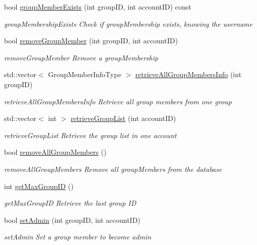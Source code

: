 \begin{DoxyCompactItemize}
bool \hyperlink{classGroupMemberDB_af486022344b536264a49ae393420ad31}{group\+Member\+Exists} (int group\+ID, int account\+ID) const 
\begin{DoxyCompactList}\small\item\em group\+Membership\+Exists Check if group\+Membership exists, knowing the username \end{DoxyCompactList}\item 
bool \hyperlink{classGroupMemberDB_a527709d6b0a85ab6d452f56ff04903b8}{remove\+Group\+Member} (int group\+ID, int account\+ID)
\begin{DoxyCompactList}\small\item\em remove\+Group\+Member Remove a group\+Membership \end{DoxyCompactList}\item 
std\+::vector$<$ Group\+Member\+Info\+Type $>$ \hyperlink{classGroupMemberDB_ad926d57d28dfacd2fcde5511cae62f2e}{retrieve\+All\+Group\+Members\+Info} (int group\+ID)
\begin{DoxyCompactList}\small\item\em retrieve\+All\+Group\+Members\+Info Retrieve all group members from one group \end{DoxyCompactList}\item 
std\+::vector$<$ int $>$ \hyperlink{classGroupMemberDB_a43fa2ec7bc3c7e33970d60f480313974}{retrieve\+Group\+List} (int account\+ID)
\begin{DoxyCompactList}\small\item\em retrieve\+Group\+List Retrieve the group list in one account \end{DoxyCompactList}\item 
bool \hyperlink{classGroupMemberDB_a53061a946cb3b711a2e741c091421eec}{remove\+All\+Group\+Members} ()
\begin{DoxyCompactList}\small\item\em remove\+All\+Group\+Members Remove all group\+Members from the database \end{DoxyCompactList}\item 
int \hyperlink{classGroupMemberDB_a92446b1ca15758048fb48e17dff86d88}{get\+Max\+Group\+ID} ()
\begin{DoxyCompactList}\small\item\em get\+Max\+Group\+ID Retrieve the last group ID \end{DoxyCompactList}\item 
bool \hyperlink{classGroupMemberDB_aa89464f493771ef0cc0d661d4c7391b9}{set\+Admin} (int group\+ID, int account\+ID)
\begin{DoxyCompactList}\small\item\em set\+Admin Set a group member to become admin \end{DoxyCompactList}\end{DoxyCompactItemize}


